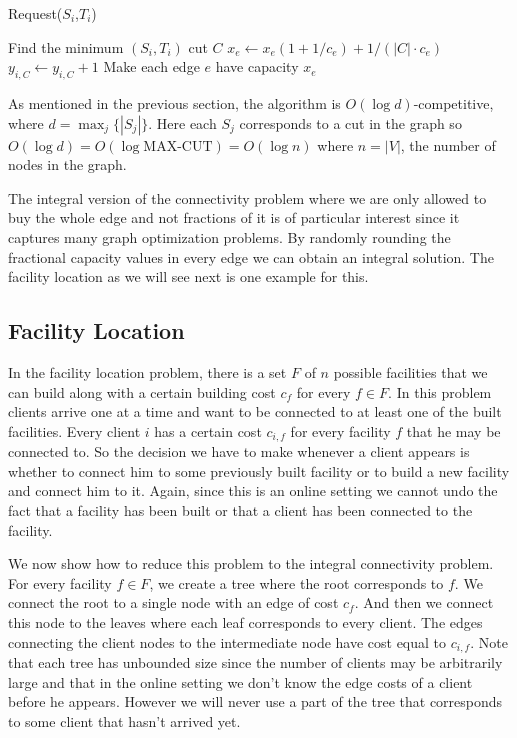 \begin{algorithm}
\caption{Request($S_i$,$T_i$)}
\begin{algorithmic}[1]
  \STATE Find the minimum  $(S_i,T_i)$ cut $C$
    \STATE $x_e \leftarrow x_e (1 + 1/c_e) + 1/(|C| \cdot c_e)$ 
  \ENDFOR
  \STATE $y_{i,C} \leftarrow y_{i,C} + 1$
\ENDWHILE
\STATE Make each edge $e$ have capacity $x_e$
\end{algorithmic}
\end{algorithm}

As mentioned in the previous section, the algorithm is $O(\log d)$-competitive, where $d = \max_j\{|S_j|\}$. Here each $S_j$ corresponds to a cut in the graph so $O( \log d ) = O( \log \textrm{MAX-CUT} ) = O( \log n )$ where $n = |V|$, the number of nodes in the graph.

The integral version of the connectivity problem where we are only allowed to buy the whole edge and not fractions of it is of particular interest since it captures many graph optimization problems. By randomly rounding the fractional capacity values in every edge we can obtain an integral solution. The facility location as we will see next is one example for this.

\subsection{Facility Location}
In the facility location problem, there is a set $F$ of $n$ possible facilities that we can build along with a certain building cost $c_f$ for every $f \in F$. In this problem clients arrive one at a time and want to be connected to at least one of the built facilities. Every client $i$ has a certain cost $c_{i,f}$ for every facility $f$ that he may be connected to. So the decision we have to make whenever a client appears is whether to connect him to some previously built facility or to build a new facility and connect him to it. Again, since this is an online setting we cannot undo the fact that a facility has been built or that a client has been connected to the facility.

We now show how to reduce this problem to the integral connectivity problem. For every facility $f \in F$, we create a tree where the root corresponds to $f$. We connect the root to a single node with an edge of cost $c_f$. And then we connect this node to the leaves where each leaf corresponds to every client. The edges connecting the client nodes to the intermediate node have cost equal to $c_{i,f}$. Note that each tree has unbounded size since the number of clients may be arbitrarily large and that in the online setting we don't know the edge costs of a client before he appears. However we will never use a part of the tree that corresponds to some client that hasn't arrived yet.

